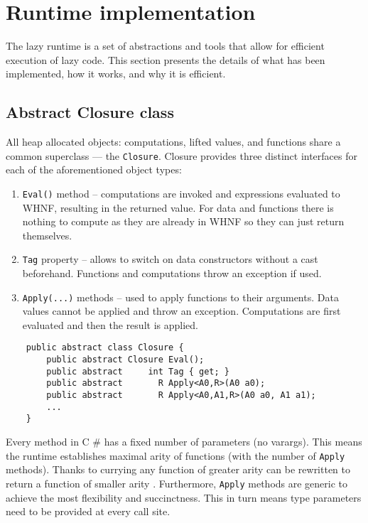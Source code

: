 \documentclass[en]{pracamgr}
\newcommand{\shrp}{%
  {\fontfamily{ppl}\selectfont\#%
  }}
\begin{document}
\section{Runtime implementation}\label{s:runtime_impl}

The lazy runtime is a set of abstractions and tools
that allow for efficient execution of lazy code.
This section presents the details of what has been implemented,
how it works, and why it is efficient.

\subsection{Abstract Closure class}

All heap allocated objects: computations, lifted values,
and functions share a common superclass –– the \texttt{Closure}.
Closure provides three distinct interfaces for each of the aforementioned object types:

\begin{enumerate}
    \item \texttt{Eval()} method -- computations are
    invoked and expressions evaluated to WHNF, resulting in
    the returned value. For data and functions there is
    nothing to compute as they are already in WHNF so they
    can just return themselves.
    \item \texttt{Tag} property -- allows to switch on data
    constructors without a cast beforehand. Functions and
    computations throw an exception if used.
    \item \texttt{Apply(...)} methods -- used to apply
    functions to their arguments. Data values cannot be
    applied and throw an exception. Computations are first
    evaluated and then the result is applied.
\end{enumerate}

\begin{verbatim}
    public abstract class Closure {
        public abstract Closure Eval();
        public abstract     int Tag { get; }
        public abstract       R Apply<A0,R>(A0 a0);
        public abstract       R Apply<A0,A1,R>(A0 a0, A1 a1);
        ...
    }
\end{verbatim}

Every method in C\shrp{} has a fixed number of parameters (no varargs).
This means the runtime establishes maximal arity of functions
(with the number of \texttt{Apply} methods).
Thanks to currying any function of greater arity can be
rewritten to return a function of smaller arity \cite{Curry}.
Furthermore, \texttt{Apply} methods are generic to achieve
the most flexibility and succinctness.
This in turn means type parameters need to be provided at every call site.
\end{document}

